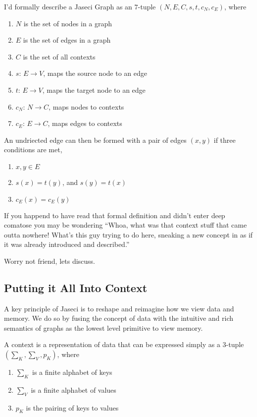 \begin{nerd}
    I'd formally describe a Jaseci Graph as an $7$-tuple $(N,E,C,s,t,c_N,c_E)$, where
    \begin{enumerate}
        \item $N$ is the set of nodes in a graph
        \item $E$ is the set of edges in a graph
        \item $C$ is the set of all contexts
        \item $s$: $E \rightarrow V$, maps the source node to an edge
        \item $t$: $E \rightarrow V$,  maps the target node to an edge
        \item $c_N$: $N \rightarrow C$, maps nodes to contexts
        \item $c_E$: $E \rightarrow C$, maps edges to contexts
    \end{enumerate}
    An undriected edge can then be formed with a pair of edges $(x, y)$ if three conditions are met,
    \begin{enumerate}
        \item $x, y \in E$
        \item $s(x) = t(y)$, and $s(y) = t(x)$
        \item $c_E(x) = c_E(y)$
    \end{enumerate}
\end{nerd}
\par
If you happend to have read that formal definition and didn't enter deep comatose you may be wondering ``Whoa, what was that context stuff that came outta nowhere! What's this guy trying to do here, sneaking a new concept in as if it was already introduced and described.''
\par
Worry not friend, lets discuss.
\subsection{Putting it All Into Context}

A key principle of Jaseci is to reshape and reimagine how we view data and memory. We do so by fusing the concept of data with the intuitive and rich semantics of graphs as the lowest level primitive to view memory.

\begin{nerd}
    A context is a representation of data that can be expressed simply as a $3$-tuple $(\sum_K,\sum_V,p_K)$, where
    \begin{enumerate}
        \item $\sum_K$ is a finite alphabet of keys
        \item $\sum_V$ is a finite alphabet of values
        \item $p_K$ is the pairing of keys to values
    \end{enumerate}
\end{nerd}
